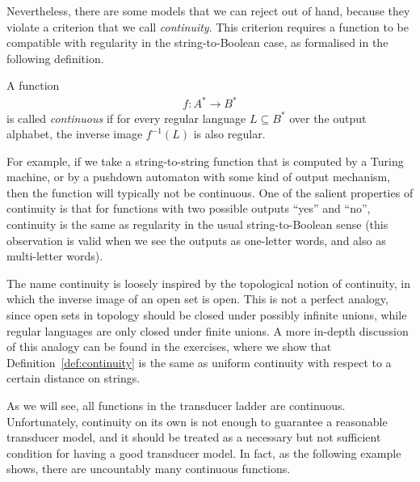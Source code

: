 Nevertheless, there are some models that we can reject out of hand, because they violate a criterion that we call \emph{continuity}. This criterion requires a function to be compatible with regularity in the string-to-Boolean case, as formalised in the following definition. 
\begin{definition}
    \label{def:continuity}
    A  function 
    \begin{align*}
    f : A^* \to B^*
    \end{align*}
    is called \emph{continuous} if for every regular language $L \subseteq B^*$ over the output alphabet, the inverse image $f^{-1}(L)$ is also regular.
\end{definition}

For example, if we take a string-to-string  function that is  computed by a Turing machine, or by a pushdown automaton with some kind of output mechanism, then the function  will typically not be  continuous.  One of the salient properties of continuity is that for functions with two possible outputs ``yes'' and ``no'', continuity is the same as regularity in the usual string-to-Boolean sense (this observation is valid when we see the outputs as one-letter words, and also as multi-letter words).

The name continuity is loosely inspired by the topological notion of continuity, in which the inverse image of an open set is open. This is not a perfect analogy, since open sets in topology should be closed under possibly infinite unions, while regular languages are only closed under finite unions. A more in-depth discussion of this analogy can be found in the exercises, where we show that Definition~\ref{def:continuity} is the same as uniform continuity with respect to a certain distance on strings.

As we will see, all functions in the transducer ladder are  continuous. Unfortunately, continuity on its own is not enough to guarantee a reasonable transducer model, and it should be treated as a necessary but not sufficient condition for having a good transducer model. In fact, as the following example shows, there are uncountably many continuous functions.

